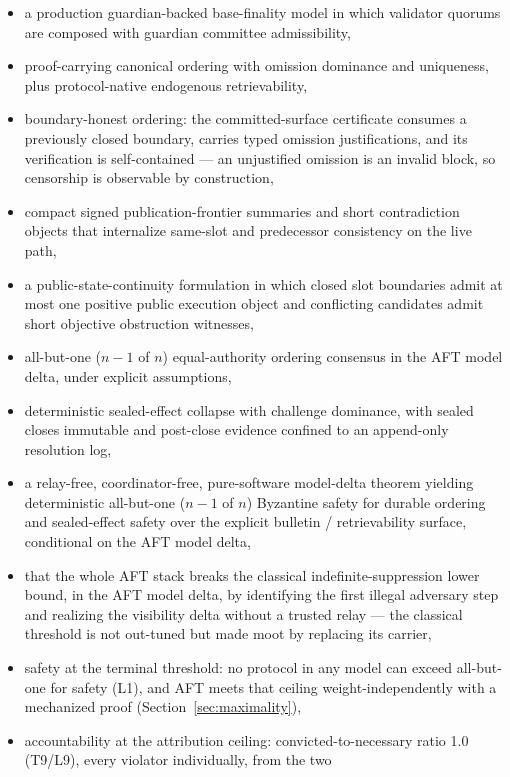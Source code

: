 \documentclass[11pt]{article}
\newcommand{\AFT}{\textsc{AFT}}
\begin{document}
\begin{itemize}[leftmargin=1.5em]
\item a production guardian-backed base-finality model in which validator
quorums are composed with guardian committee admissibility,
\item proof-carrying canonical ordering with omission dominance and uniqueness,
plus protocol-native endogenous retrievability,
\item boundary-honest ordering: the committed-surface certificate consumes
a previously closed boundary, carries typed omission justifications, and
its verification is self-contained --- an unjustified omission is an
invalid block, so censorship is observable by construction,
\item compact signed publication-frontier summaries and short contradiction
objects that internalize same-slot and predecessor consistency on the live
path,
\item a public-state-continuity formulation in which closed slot boundaries
admit at most one positive public execution object and conflicting candidates
admit short objective obstruction witnesses,
\item all-but-one (\(n-1\) of \(n\)) equal-authority ordering consensus in the
AFT model delta, under explicit
assumptions,
\item deterministic sealed-effect collapse with challenge dominance, with
sealed closes immutable and post-close evidence confined to an append-only
resolution log,
\item a relay-free, coordinator-free, pure-software model-delta
theorem yielding deterministic all-but-one (\(n-1\) of \(n\)) Byzantine safety
for durable
ordering and sealed-effect safety over the explicit bulletin /
retrievability surface, conditional on the AFT model delta,
\item that the whole \AFT{} stack breaks the classical indefinite-suppression
lower bound, in the AFT model delta, by identifying the first illegal
adversary step and realizing the
visibility delta without a trusted relay --- the classical threshold is
not out-tuned but made moot by replacing its carrier,
\item safety at the terminal threshold: no protocol in any model can
exceed all-but-one for safety (L1), and \AFT{} meets that ceiling
weight-independently with a mechanized proof
(Section~\ref{sec:maximality}),
\item accountability at the attribution ceiling: convicted-to-necessary
ratio 1.0 (T9/L9), every violator individually, from the two

\end{itemize}
\end{document}
